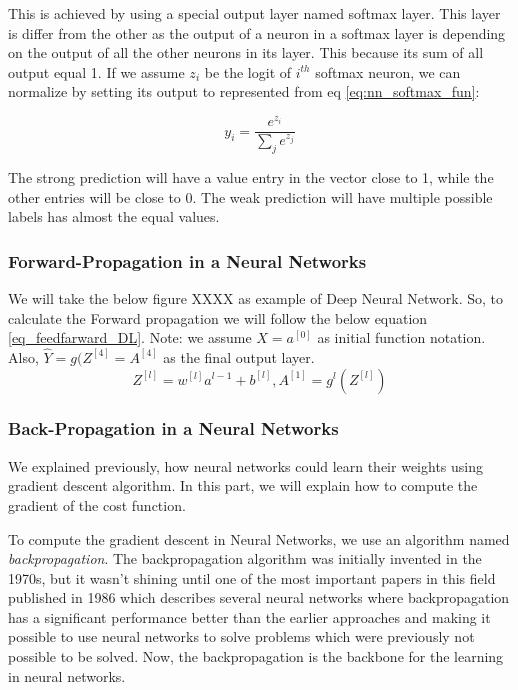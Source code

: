 This is achieved by using a special output layer named softmax layer. This layer is differ from the other as the output of a neuron in a softmax layer is depending on the output of all the other neurons in its layer. This because its sum of all output equal 1. If we assume $z_i$ be the logit of $i^{th}$ softmax neuron, we can normalize by setting its output to represented from eq \eqref{eq:nn_softmax_fun}:

\begin{equation}\label{eq:nn_softmax_fun}
  y_i=\frac{e^{z_i}}{\sum_je^{z_j}}
\end{equation}

The strong prediction will have a value entry in the vector close to 1, while the other entries will be close to 0. The weak prediction will have multiple possible labels has almost the equal values\cite{DLFundamentals}.



\subsubsection{Forward-Propagation in a Neural Networks}
We will take the below figure XXXX as example of Deep Neural Network. So, to calculate the Forward propagation we will follow the below equation \eqref{eq_feedfarward_DL}. Note: we assume $X = a^{[0]}$ as initial function notation. Also, $\widehat{Y}= g(Z^{[4]}=A^{[4]}$ as the final output layer.
\begin{equation}\label{eq_feedfarward_DL}
     Z^{[l]}  = w^{[l]} a^{l-1} + b^{[l]} , A^{[1]} = g^{l}(Z^{[l]})
   \end{equation}



\subsubsection{Back-Propagation in a Neural Networks}

We explained previously,  how neural networks could learn their weights using gradient descent algorithm. In this part, we will explain how to compute the gradient of the cost function.

To compute the gradient descent in Neural Networks, we use an algorithm named \textit{backpropagation}. The backpropagation algorithm was initially invented in the 1970s, but it wasn't shining until one of the most important papers in this field published in 1986 %
which describes several neural networks where backpropagation has a significant performance better than the earlier approaches and making it possible to use neural networks to solve problems which were previously not possible to be solved. Now, the backpropagation is the backbone for the learning in neural networks.%


